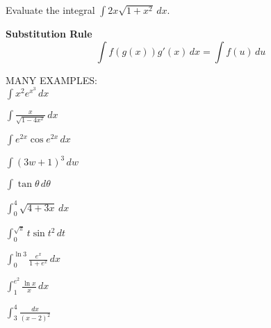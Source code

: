 \documentclass[11pt]{article}
\begin{document}
\vspace{2.5in}




Evaluate the integral $\int 2x\sqrt{1+x^2}\, dx $.

\vspace{3in}


{\bf Substitution Rule} \\

\begin{displaymath}
\int f(g(x))g'(x) \, dx = \int f(u) \, du
  \end{displaymath}




\pagebreak

MANY EXAMPLES:\\


$\int x^2e^{x^3}\, dx$

\vspace{1.5in}

$\int \frac{x}{\sqrt{1-4x^2}}\, dx$

\vspace{1.5in}

$\int e^{2x}\cos{e^{2x}} \, dx$

\vspace{1.5in}

$\int (3w+1)^3 \, dw$


\vspace{1.5in}

$\int \tan{\theta} \, d\theta$

\pagebreak


$\int_0^4 \sqrt{4+3x} \, dx$

\vspace{2in}

$\int_0^{\sqrt{\pi}} t\sin{t^2} \, dt$

\vspace{1.5in}

$\int_0^{\ln{3}} \frac{e^x}{1+e^x} \, dx$

\vspace{1.5in}


$\int_1^{e^{2}} \frac{\ln{x}}{x} \, dx$

\vspace{1.5in}

$\int_3^{4} \frac{dx}{(x-2)^2} $
\end{document}

